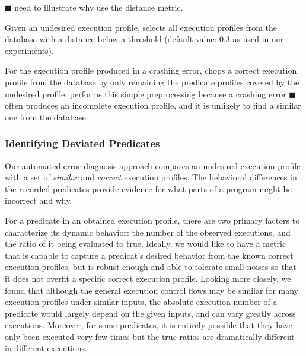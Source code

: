 $\blacksquare$ need to illustrate why use the distance metric.

Given an undesired execution profile, \ourtool selects all execution profiles from the database
with a distance below a threshold (default value: 0.3 as used in our
experiments).

For the execution profile produced in a crashing error, \ourtool 
chops a correct execution profile from the database by only remaining the predicate
profiles covered by the undesired profile. \ourtool performs
this simple preprocessing because a crashing error $\blacksquare$
often produces an incomplete execution profile, and it is unlikely
to find a similar one from the database.


\subsubsection{Identifying Deviated Predicates}
\label{sec:deviation}


Our
automated error diagnosis approach compares an undesired execution profile with a set
of \textit{similar} and \textit{correct} execution profiles. 
The behavioral differences in the recorded predicates provide evidence for what parts of a program might be
incorrect and why. %

For a predicate in an obtained execution profile,
there are two primary factors to
characterize its dynamic behavior: the number of the
observed executions, and the ratio of it being evaluated to true.
Ideally, we would like to have a metric that
is capable to capture a predicat's desired behavior
from the known correct execution profiles, but is robust enough and
able to tolerate small noises so that it does
not overfit a specific correct execution profile.
Looking more closely, we found that although
the general execution control flows may be similar for many 
execution profiles under similar inputs, the absolute execution
number of a predicate would largely depend on the given inputs, and
can vary greatly across executions. Moreover, for
some predicates, it is entirely possible that they have
only been executed very few times but the true ratios
are dramatically different in different executions.

